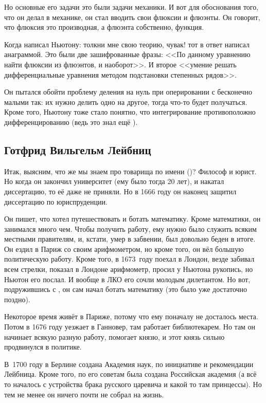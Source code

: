 \documentclass[a4paper,oneside,fleqn,10pt]{article}
\begin{document}
Но основные его задачи это были задачи механики. И вот для обоснования
того, что он делал в механике, он стал вводить свои флюксии и флюэнты.
Он говорит, что флюксия это производная, а флюэнта собственно,
функция.

Когда  написал Ньютону: толкни мне свою теорию, чувак!
тот в ответ написал анаграммой.  Это были две зашифрованные фразы:
<<По данному уравнению найти флюксии из флюэнтов, и наоборот>>.  И
второе <<умение решать дифференциальные уравнения методом подстановки
степенных рядов>>.

Он пытался обойти проблему деления на нуль при оперировании с
бесконечно малыми так: их нужно делить одно на другое, тогда что-то
будет получаться. Кроме того, Ньютону тоже стало понятно, что
интегрирование противоположно дифференцированию (ведь это знал ещё
).

\subsection{Готфрид Вильгельм Лейбниц}

Итак, выясним, что же мы знаем про товарища по имени  ()?
Философ и юрист. Но когда он закончил университет (ему было тогда 20
лет), и накатал диссертацию, то её даже не приняли. Но в 1666 году он
наконец защитил диссертацию по юриспруденции.

Он пишет, что хотел путешествовать и ботать математику. Кроме
математики, он занимался много чем. Чтобы получить работу, ему нужно
было служить всяким местными правителям, и, кстати, умер в забвении,
был довольно беден в итоге.  Он ездил в Париж со своим арифмометром,
но кроме того, он вёл большую политическую работу. Кроме того, в
1673~году поехал в Лондон, везде забивал всем стрелки, показал в
Лондоне арифмометр, просил у Ньютона рукопись, но Ньютон его послал.
И вообще в ЛКО его сочли молодым дилетантом. Но вот, подружившись с
, он сам начал ботать математику (это было
уже достаточно поздно).

Некоторое время живёт в Париже, потому что ему поначалу не досталось
места.  Потом в 1676 году уезжает в Ганновер, там работает
библиотекарем.  Но там он начинает всякую разную работу, помогает
князю, и этот князь сильно продвинулся в политике.

В~1700 году в Берлине создана Академия наук, по инициативе и
рекомендации Лейбница. Кроме того, по его советам была создана
Российская академия (а всё то началось с устройства брака русского
царевича и какой то там принцессы).  Но тем не менее он ничего почти
не собрал на жизнь.
\end{document}
